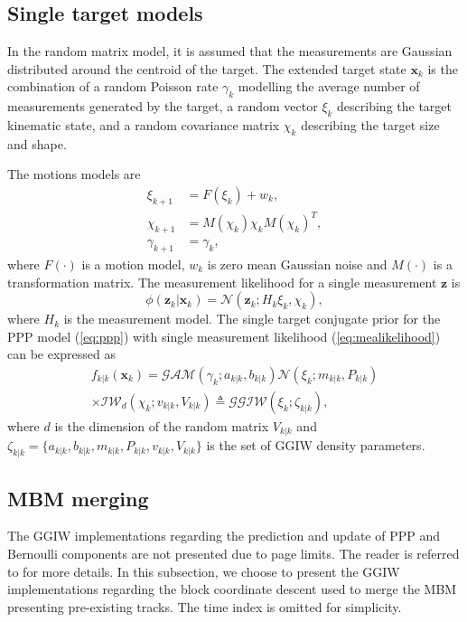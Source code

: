 \documentclass[conference]{IEEEtran}
\begin{document}

\subsection{Single target models}
In the random matrix model, it is assumed that the measurements are Gaussian distributed around the centroid of the target. The extended target state $\mathbf{x}_k$ is the combination of a random Poisson rate $\gamma_k$ modelling the average number of measurements generated by the target, a random vector $\xi_k$ describing the target kinematic state, and a random covariance matrix $\chi_k$ describing the target size and shape.

The motions models are
\begin{subequations}
\begin{align}
    \xi_{k+1} &= F(\xi_k) + w_k,\\
    \chi_{k+1} &= M(\chi_k)\chi_kM(\chi_k)^T,\\
    \gamma_{k+1} &= \gamma_k,
\end{align}
\end{subequations}
where $F(\cdot)$ is a motion model, $w_k$ is zero mean Gaussian noise and $M(\cdot)$ is a transformation matrix. The measurement likelihood for a single measurement $\mathbf{z}$ is
\begin{equation}
    \phi(\mathbf{z}_k|\mathbf{x}_k) = \mathcal{N}(\mathbf{z}_k;H_k\xi_k,\chi_k),
    \label{eq:mealikelihood}
\end{equation}
where $H_k$ is the measurement model. The single target conjugate prior for the PPP model (\ref{eq:ppp}) with single measurement
likelihood (\ref{eq:mealikelihood}) can be expressed as
\begin{multline}
f_{k|k}(\mathbf{x}_k) = \mathcal{GAM}(\gamma_k;a_{k|k},b_{k|k})\mathcal{N}(\xi_k;m_{k|k},P_{k|k})\\ \times\mathcal{IW}_d(\chi_k;v_{k|k},V_{k|k}) \triangleq \mathcal{GGIW}(\xi_k;\zeta_{k|k}),
\end{multline}
where $d$ is the dimension of the random matrix $V_{k|k}$ and $\zeta_{k|k} = \{a_{k|k},b_{k|k},m_{k|k},P_{k|k},v_{k|k},V_{k|k}\}$ is the set of GGIW density parameters. 

\subsection{MBM merging}
The GGIW implementations regarding the prediction and update of PPP and Bernoulli components are not presented due to page limits. The reader is referred to \cite{pmbmextended,pmbmextended2} for more details. In this subsection, we choose to present the GGIW implementations regarding the block coordinate descent used to merge the MBM presenting pre-existing tracks. The time index is omitted for simplicity.
\end{document}
